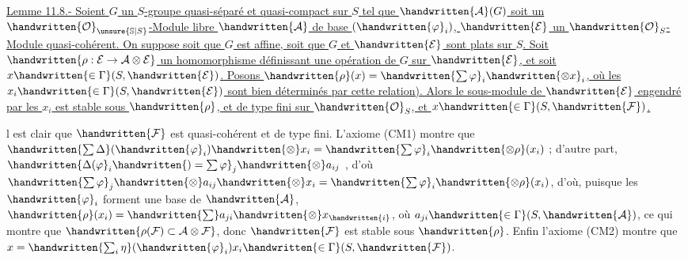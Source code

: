 \uline{Lemme 11.8.- Soient $G$ un $S$-groupe quasi-séparé et quasi-compact sur $S$ tel que $\handwritten{\mathcal{A}}(G)$ soit un $\handwritten{\mathcal{O}}_{\unsure{\mathbb{S}|S}}$-Module  libre $\handwritten{\mathcal{A}}$ de base $(\handwritten{\varphi}_i)$, $\handwritten{\mathcal{E}}$ un $\handwritten{\mathcal{O}}_S$-Module quasi-cohérent. On suppose soit que $G$ est affine, soit que $G$ et $\handwritten{\mathcal{E}}$ sont plats sur $S$. Soit $\handwritten{\rho:\mathcal{E}\to\mathcal{A}\otimes\mathcal{E}}$ un homomorphisme définissant une opération de $G$ sur $\handwritten{\mathcal{E}}$, et soit $x\handwritten{\in\Gamma}(S,\handwritten{\mathcal{E}})$. Posons $\handwritten{\rho}(x)=\handwritten{\sum\varphi}_i\handwritten{\otimes x}_i$, où les $x_i\handwritten{\in\Gamma}(S,\handwritten{\mathcal{E}})$ sont bien déterminés par cette relation). Alors le sous-module de $\handwritten{\mathcal{E}}$ engendré par les $x_i$ est stable sous $\handwritten{\rho}$, et de type fini sur $\handwritten{\mathcal{O}}_S$, et $x\handwritten{\in\Gamma}(S,\handwritten{\mathcal{F}})$.}

 l est clair que $\handwritten{\mathcal{F}}$ est quasi-cohérent et de type fini. L'axiome (CM1) montre que $\handwritten{\sum\Delta}(\handwritten{\varphi}_i)\handwritten{\otimes}x_i=\handwritten{\sum\varphi}_i\handwritten{\otimes\rho}(x_i)$ ; d'autre part, $\handwritten{\Delta(\varphi}_i\handwritten{)=\sum\varphi}_j\handwritten{\otimes}a_{ij}$ , d'où $\handwritten{\sum\varphi}_j\handwritten{\otimes}a_{ij}\handwritten{\otimes}x_i=\handwritten{\sum\varphi}_i\handwritten{\otimes\rho}(x_i)$, d'où, puisque les $\handwritten{\varphi}_i$ forment une base de $\handwritten{\mathcal{A}}$, $\handwritten{\rho}(x_i)=\handwritten{\sum}a_{ji}\handwritten{\otimes}x_{\handwritten{i}}$, où $a_{ji}\handwritten{\in\Gamma}(S,\handwritten{\mathcal{A}})$, ce qui montre que $\handwritten{\rho(\mathcal{F})\subset\mathcal{A}\otimes\mathcal{F}}$, donc $\handwritten{\mathcal{F}}$ est stable sous $\handwritten{\rho}$. Enfin l'axiome (CM2) montre que $x=\handwritten{\sum_i\eta}(\handwritten{\varphi}_i)x_i\handwritten{\in\Gamma}(S,\handwritten{\mathcal{F}})$.

